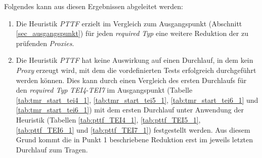 \begin{multicols}{2}
\end{multicols}
\newpage
\noindent
Folgendes kann aus diesen Ergebnissen abgeleitet werden:
\begin{enumerate}
\item Die \Gls{Heuristik} \emph{PTTF} erzielt im Vergleich zum Ausgangspunkt (Abschnitt \ref{sec_ausgangspunkt}) für jeden \emph{required Typ} eine weitere Reduktion der zu prüfenden \emph{Proxies}.

\item Die \Gls{Heuristik} \emph{PTTF} hat keine Auswirkung auf einen Durchlauf, in dem kein \emph{Proxy} erzeugt wird, mit dem die vordefinierten Tests erfolgreich durchgeführt werden können. Dies kann durch einen Vergleich des ersten Durchlaufs für den \emph{required Typ} \emph{TEI4}-\emph{TEI7} im Ausgangspunkt (Tabelle \ref{tab:tmr_start_tei4_1}, \ref{tab:tmr_start_tei5_1}, \ref{tab:tmr_start_tei6_1} und \ref{tab:tmr_start_tei6_1}) mit dem ersten Durchlauf unter Anwendung der \Gls{Heuristik} (Tabellen \ref{tab:pttf_TEI4_1}, \ref{tab:pttf_TEI5_1}, \ref{tab:pttf_TEI6_1} und \ref{tab:pttf_TEI7_1}) festgestellt werden. Aus diesem Grund kommt die in Punkt 1 beschriebene Reduktion erst im jeweils letzten Durchlauf zum Tragen.
\end{enumerate}